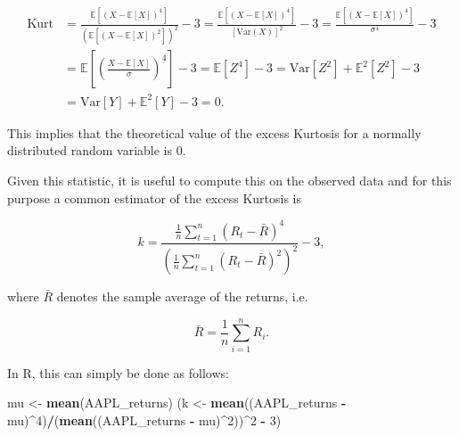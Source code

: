 \documentclass[12pt,]{krantz}
\newenvironment{Shaded}{\begin{snugshade}}{\end{snugshade}}
\newcommand{\KeywordTok}[1]{\textcolor[rgb]{0.27,0.27,0.27}{\textbf{#1}}}
\newcommand{\DecValTok}[1]{\textcolor[rgb]{0.06,0.06,0.06}{#1}}
\newcommand{\StringTok}[1]{\textcolor[rgb]{0.5,0.5,0.5}{#1}}
\newcommand{\OperatorTok}[1]{\textcolor[rgb]{0.43,0.43,0.43}{\textbf{#1}}}
\newcommand{\NormalTok}[1]{#1}
\begin{document}
\begin{equation}
  \begin{aligned}
\text{Kurt}  &= \frac{{\mathbb{E}}\left[\left(X - \mathbb{E}[X]\right)^4\right]}{\left({\mathbb{E}}\left[\left(X - \mathbb{E}[X]\right)^2\right]\right)^2} - 3 = \frac{{\mathbb{E}}\left[\left(X - \mathbb{E}[X]\right)^4\right]}{\left[\text{Var} \left(X\right)\right]^2} - 3 = \frac{{\mathbb{E}}\left[\left(X - \mathbb{E}[X]\right)^4\right]}{\sigma^4}  - 3\\
&= {\mathbb{E}}\left[\left(\frac{X - \mathbb{E}[X]}{\sigma}\right)^4\right] - 3 = \mathbb{E}\left[Z^4\right] - 3 = \text{Var}[Z^2] + \mathbb{E}^2\left[Z^2\right]  - 3\\
&= \text{Var}[Y] + \mathbb{E}^2\left[Y\right]  - 3 = 0.
  \end{aligned}
\end{equation}

This implies that the theoretical value of the excess Kurtosis for a
normally distributed random variable is \(0\).

\newline

Given this statistic, it is useful to compute this on the observed data
and for this purpose a common estimator of the excess Kurtosis is

\begin{equation}
  k = \frac{\frac{1}{n} \sum_{t = 1}^{n} \left(R_t -\bar{R}\right)^4}{\left(\frac{1}{n} \sum_{t = 1}^{n} \left(R_t -\bar{R}\right)^2 \right)^2} - 3,
\end{equation}

where \(\bar{R}\) denotes the sample average of the returns, i.e.

\begin{equation*}
  \bar{R} = \frac{1}{n} \sum_{i = 1}^n R_i.
\end{equation*}

In R, this can simply be done as follows:

\begin{Shaded}
\begin{Highlighting}[]
\NormalTok{mu <-}\StringTok{ }\KeywordTok{mean}\NormalTok{(AAPL_returns)}
\NormalTok{(k <-}\StringTok{ }\KeywordTok{mean}\NormalTok{((AAPL_returns }\OperatorTok{-}\StringTok{ }\NormalTok{mu)}\OperatorTok{^}\DecValTok{4}\NormalTok{)}\OperatorTok{/}\NormalTok{(}\KeywordTok{mean}\NormalTok{((AAPL_returns }\OperatorTok{-}\StringTok{ }\NormalTok{mu)}\OperatorTok{^}\DecValTok{2}\NormalTok{))}\OperatorTok{^}\DecValTok{2} \OperatorTok{-}\StringTok{ }\DecValTok{3}\NormalTok{)}
\end{Highlighting}
\end{Shaded}
\end{document}
